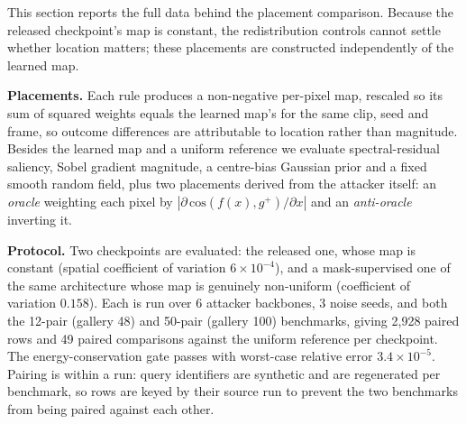 \documentclass[10pt,journal]{IEEEtran}
\begin{document}
This section reports the full data behind the placement comparison. Because
the released checkpoint's map is constant, the redistribution controls cannot
settle whether location matters; these placements are constructed
independently of the learned map.

\textbf{Placements.} Each rule produces a non-negative per-pixel map, rescaled
so its sum of squared weights equals the learned map's for the same clip,
seed and frame, so outcome differences are attributable to location rather
than magnitude. Besides the learned map and a uniform reference we evaluate
spectral-residual saliency, Sobel gradient magnitude, a centre-bias Gaussian
prior and a fixed smooth random field, plus two placements derived from the
attacker itself: an \emph{oracle} weighting each pixel by
$|\partial\,\mathrm{cos}(f(x),g^{+})/\partial x|$ and an \emph{anti-oracle}
inverting it.

\textbf{Protocol.} Two checkpoints are evaluated: the released one, whose map
is constant (spatial coefficient of variation $6\times10^{-4}$), and a
mask-supervised one of the same architecture whose map is genuinely
non-uniform (coefficient of variation $0.158$). Each is run over 6 attacker
backbones, 3 noise seeds, and both the 12-pair (gallery 48) and 50-pair
(gallery 100) benchmarks, giving 2,928 paired rows and 49 paired comparisons
against the uniform reference per checkpoint. The energy-conservation gate
passes with worst-case relative error $3.4\times10^{-5}$. Pairing is within a
run: query identifiers are synthetic and are regenerated per benchmark, so
rows are keyed by their source run to prevent the two benchmarks from being
paired against each other.
\end{document}
